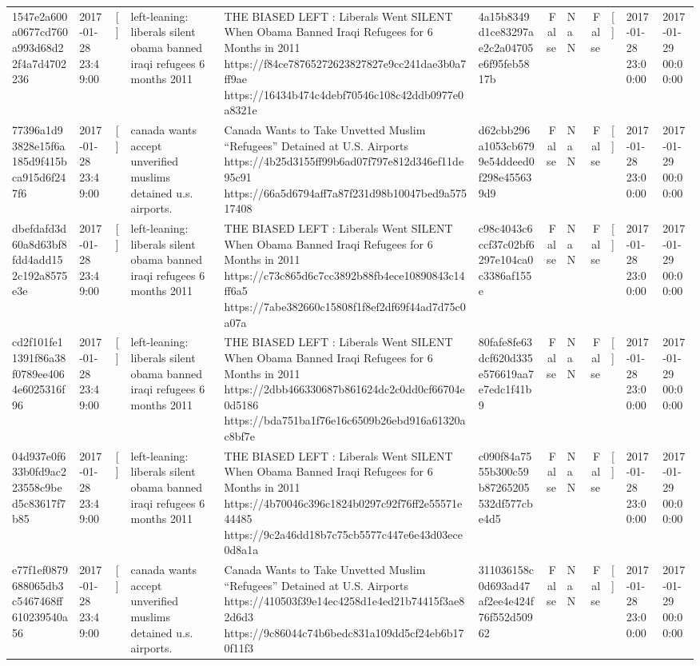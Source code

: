 \begin{tabular}{llllllrlrlll}
1547e2a600a0677cd760a993d68d22f4a7d4702236 & 2017-01-28 23:49:00 & [] & left-leaning: liberals silent obama banned iraqi refugees 6 months 2011 & THE BIASED LEFT : Liberals Went SILENT When Obama Banned Iraqi Refugees for 6 Months in 2011 https://f84ce78765272623827827e9cc241dae3b0a7ff9ae https://16434b474c4debf70546c108c42ddb0977e0a8321e & 4a15b8349d1ce83297ae2c2a04705e6f95feb5817b & False & NaN & False & [] & 2017-01-28 23:00:00 & 2017-01-29 00:00:00 \\
77396a1d93828e15f6a185d9f415bca915d6f247f6 & 2017-01-28 23:49:00 & [] & canada wants accept unverified muslims detained u.s. airports. & Canada Wants to Take Unvetted Muslim “Refugees” Detained at U.S. Airports https://4b25d3155ff99b6ad07f797e812d346ef11de95c91 https://66a5d6794aff7a87f231d98b10047bed9a57517408 & d62cbb296a1053cb6799e54ddeed0f298e455639d9 & False & NaN & False & [] & 2017-01-28 23:00:00 & 2017-01-29 00:00:00 \\
dbefdafd3d60a8d63bf8fdd4add152c192a8575e3e & 2017-01-28 23:49:00 & [] & left-leaning: liberals silent obama banned iraqi refugees 6 months 2011 & THE BIASED LEFT : Liberals Went SILENT When Obama Banned Iraqi Refugees for 6 Months in 2011 https://c73c865d6c7cc3892b88fb4ece10890843c14ff6a5 https://7abe382660c15808f1f8ef2df69f44ad7d75c0a07a & c98c4043c6ccf37c02bf6297e104ca0c3386af155e & False & NaN & False & [] & 2017-01-28 23:00:00 & 2017-01-29 00:00:00 \\
cd2f101fe11391f86a38f0789ee4064e6025316f96 & 2017-01-28 23:49:00 & [] & left-leaning: liberals silent obama banned iraqi refugees 6 months 2011 & THE BIASED LEFT : Liberals Went SILENT When Obama Banned Iraqi Refugees for 6 Months in 2011 https://2dbb466330687b861624dc2c0dd0cf66704e0d5186 https://bda751ba1f76e16c6509b26ebd916a61320ac8bf7e & 80fafe8fe63dcf620d335e576619aa7e7edc1f41b9 & False & NaN & False & [] & 2017-01-28 23:00:00 & 2017-01-29 00:00:00 \\
04d937e0f633b0fd9ac223558c9bed5c83617f7b85 & 2017-01-28 23:49:00 & [] & left-leaning: liberals silent obama banned iraqi refugees 6 months 2011 & THE BIASED LEFT : Liberals Went SILENT When Obama Banned Iraqi Refugees for 6 Months in 2011 https://4b70046c396c1824b0297c92f76ff2e55571e44485 https://9c2a46dd18b7c75cb5577c447e6e43d03ece0d8a1a & c090f84a7555b300c59b87265205532df577cbe4d5 & False & NaN & False & [] & 2017-01-28 23:00:00 & 2017-01-29 00:00:00 \\
e77f1ef0879688065db3c5467468ff610239540a56 & 2017-01-28 23:49:00 & [] & canada wants accept unverified muslims detained u.s. airports. & Canada Wants to Take Unvetted Muslim “Refugees” Detained at U.S. Airports https://410503f39e14ec4258d1e4ed21b74415f3ae82d6d3 https://9c86044c74b6bedc831a109dd5cf24eb6b170f11f3 & 311036158c0d693ad47af2ee4e424f76f552d50962 & False & NaN & False & [] & 2017-01-28 23:00:00 & 2017-01-29 00:00:00 \\

\end{tabular}
